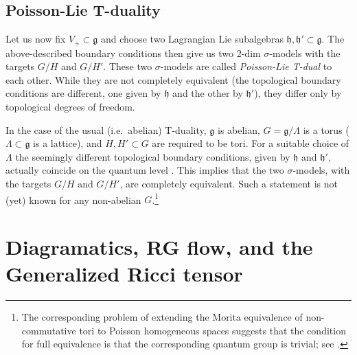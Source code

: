 \documentclass[a4paper]{amsart}
\theoremstyle{plain}
\theoremstyle{definition}
\newcommand{\g}{\mathfrak{g}}
\newcommand{\h}{\mathfrak{h}}
\begin{document}
\subsection{Poisson-Lie T-duality}

Let us now fix $V_+\subset\g$ and choose two Lagrangian Lie subalgebras $\h,\h'\subset\g$. The above-described boundary conditions then give us two 2-dim $\sigma$-models with the targets $G/H$ and $G/H'$. These two $\sigma$-models are called \emph{Poisson-Lie T-dual} \cite{KSe} to each other. While they are not completely equivalent (the topological boundary conditions are different, one given by $\h$ and the other by $\h'$), they differ only by topological degrees of freedom.

In the case of the usual (i.e.\ abelian) T-duality, $\g$ is abelian, $G=\g/\Lambda$ is a torus ($\Lambda\subset\g$ is a lattice), and $H,H'\subset G$ are required to be tori. For a suitable choice of $\Lambda$ the seemingly different topological boundary conditions, given by $\h$ and $\h'$, actually coincide on the quantum level \cite{KSa}. This implies that the two $\sigma$-models, with the targets $G/H$ and $G/H'$, are completely equivalent. Such a statement is not (yet) known for any non-abelian $G$.\footnote{The corresponding problem of extending the Morita equivalence of non-commutative tori \cite{RS} to Poisson homogeneous spaces suggests that the condition for full equivalence is that the corresponding quantum group is trivial; see \cite{Smor}.}

\section{Diagramatics, RG flow, and the Generalized Ricci tensor}\label{sec:diag}
\end{document}
